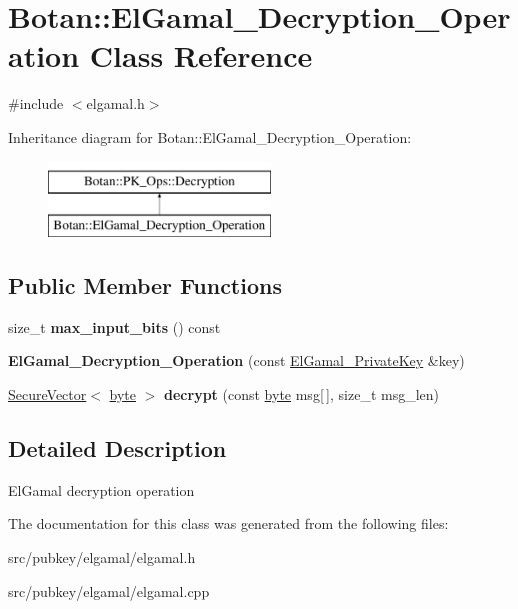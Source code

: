\hypertarget{classBotan_1_1ElGamal__Decryption__Operation}{\section{Botan\-:\-:El\-Gamal\-\_\-\-Decryption\-\_\-\-Operation Class Reference}
\label{classBotan_1_1ElGamal__Decryption__Operation}
}


{\ttfamily \#include $<$elgamal.\-h$>$}

Inheritance diagram for Botan\-:\-:El\-Gamal\-\_\-\-Decryption\-\_\-\-Operation\-:\begin{figure}[H]
\begin{center}
\leavevmode
\includegraphics[height=2.000000cm]{classBotan_1_1ElGamal__Decryption__Operation}
\end{center}
\end{figure}
\subsection*{Public Member Functions}
\begin{DoxyCompactItemize}
\item 
\hypertarget{classBotan_1_1ElGamal__Decryption__Operation_aa12af0c1f4f7cc49875357a299621aab}{size\-\_\-t {\bfseries max\-\_\-input\-\_\-bits} () const }\label{classBotan_1_1ElGamal__Decryption__Operation_aa12af0c1f4f7cc49875357a299621aab}

\item 
\hypertarget{classBotan_1_1ElGamal__Decryption__Operation_a90c1d053f53cb211c13bd87eeedfc7f8}{{\bfseries El\-Gamal\-\_\-\-Decryption\-\_\-\-Operation} (const \hyperlink{classBotan_1_1ElGamal__PrivateKey}{El\-Gamal\-\_\-\-Private\-Key} \&key)}\label{classBotan_1_1ElGamal__Decryption__Operation_a90c1d053f53cb211c13bd87eeedfc7f8}

\item 
\hypertarget{classBotan_1_1ElGamal__Decryption__Operation_a3142eee53e0cc6f1a7a797dd52051e34}{\hyperlink{classBotan_1_1SecureVector}{Secure\-Vector}$<$ \hyperlink{namespaceBotan_a7d793989d801281df48c6b19616b8b84}{byte} $>$ {\bfseries decrypt} (const \hyperlink{namespaceBotan_a7d793989d801281df48c6b19616b8b84}{byte} msg\mbox{[}$\,$\mbox{]}, size\-\_\-t msg\-\_\-len)}\label{classBotan_1_1ElGamal__Decryption__Operation_a3142eee53e0cc6f1a7a797dd52051e34}

\end{DoxyCompactItemize}


\subsection{Detailed Description}
El\-Gamal decryption operation 

The documentation for this class was generated from the following files\-:\begin{DoxyCompactItemize}
\item 
src/pubkey/elgamal/elgamal.\-h\item 
src/pubkey/elgamal/elgamal.\-cpp\end{DoxyCompactItemize}
